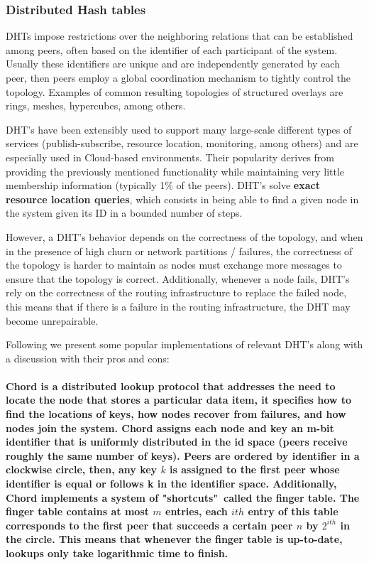 \subsubsection{Distributed Hash tables}

DHTs impose restrictions over the neighboring relations that can be established among peers, often based on the identifier of each participant of the system. Usually these identifiers are unique and are independently generated by each peer, then peers employ a global coordination mechanism to tightly control the topology. Examples of common resulting topologies of structured overlays are rings, meshes, hypercubes, among others.

DHT's have been extensibly used to support many large-scale different types of services (publish-subscribe, resource location, monitoring, among others) and are especially used in Cloud-based environments. Their popularity derives from providing the previously mentioned functionality while maintaining very little membership information (typically 1\% of the peers). DHT's solve \textbf{exact resource location queries}, which consists in being able to find a given node in the system given its ID in a bounded number of steps.

However, a DHT's behavior depends on the correctness of the topology, and when in the presence of high churn or network partitions / failures, the correctness of the topology is harder to maintain as nodes must exchange more messages to ensure that the topology is correct. Additionally, whenever a node fails, DHT's rely on the correctness of the routing infrastructure to replace the failed node, this means that if there is a failure in the routing infrastructure, the DHT may become unrepairable.

Following we present some popular implementations of relevant DHT's along with a discussion with their pros and cons:

\paragraph{ \textbf{Chord} \cite{stoica2003chord} is a distributed lookup protocol that addresses the need to locate the node that stores a particular data item, it specifies how to find the locations of keys, how nodes recover from failures, and how nodes join the system. Chord assigns each node and key an m-bit identifier that is uniformly distributed in the id space (peers receive roughly the same number of keys). Peers are ordered by identifier in a clockwise circle, then, any key \(k\) is assigned to the first peer whose identifier is equal or follows k in the identifier space. Additionally, Chord implements a system of "shortcuts"\ called the \textbf{finger table}. The finger table contains at most \(m\) entries, each $ith$ entry of this table corresponds to the first peer that succeeds a certain peer \(n\) by \(2^{ith}\) in the circle. This means that whenever the finger table is up-to-date, lookups only take logarithmic time to finish. }
    
